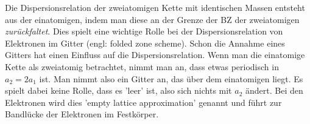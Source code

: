 Die Dispersionsrelation der zweiatomigen Kette mit identischen Massen entsteht aus der einatomigen, indem man diese an der Grenze der BZ der zweiatomigen \emph{zurückfaltet}. Dies spielt eine wichtige Rolle bei der Dispersionsrelation von Elektronen im Gitter (engl: folded zone scheme). Schon die Annahme eines Gitters hat einen Einfluss auf die Dispersionsrelation. Wenn man die einatomige Kette als zweiatomig betrachtet, nimmt man an, dass etwas periodisch in $a_2 = 2 a_1$ ist. Man nimmt also ein Gitter an, das über dem einatomigen liegt. Es spielt dabei keine Rolle, dass es 'leer' ist, also sich nichts mit $a_2$ ändert. Bei den Elektronen wird dies 'empty lattice approximation' genannt und führt zur Bandlücke der Elektronen im Festkörper.




